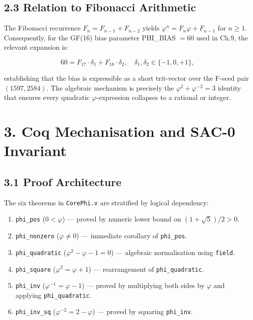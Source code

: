 \subsection{2.3 Relation to Fibonacci
Arithmetic}\label{fa_03:relation-to-fibonacci-arithmetic}

The Fibonacci recurrence
\(F_n = F_{n-1} + F_{n-2}\) yields
\(\varphi^n = F_n \varphi + F_{n-1}\) for
\(n \geq 1\). Consequently, for the GF(16) bias
parameter PHI\_BIAS \(= 60\) used in Ch.9, the
relevant expansion is:

\[60 = F_{17} \cdot \delta_1 + F_{18} \cdot \delta_2, \quad \delta_1, \delta_2 \in \{-1, 0, +1\},\]

establishing that the bias is expressible as a
short trit-vector over the F-seed pair
\((1597, 2584)\). The algebraic mechanism is
precisely the \(\varphi^2 + \varphi^{-2} = 3\)
identity that ensures every quadratic
\(\varphi\)-expression collapses to a rational or
integer.

\section{3. Coq Mechanisation and SAC-0
Invariant}\label{fa_03:coq-mechanisation-and-sac-0-invariant}

\subsection{3.1 Proof
Architecture}\label{fa_03:proof-architecture}

The six theorems in \texttt{CorePhi.v} are
stratified by logical dependency:

\begin{enumerate}
\def\labelenumi{\arabic{enumi}.}
\tightlist
\item
  \texttt{phi\_pos} (\(0 < \varphi\)) --- proved
  by numeric lower bound on
  \((1+\sqrt{5})/2 > 0\).
\item
  \texttt{phi\_nonzero} (\(\varphi \neq 0\)) ---
  immediate corollary of \texttt{phi\_pos}.
\item
  \texttt{phi\_quadratic}
  (\(\varphi^2 - \varphi - 1 = 0\)) --- algebraic
  normalisation using \texttt{field}.
\item
  \texttt{phi\_square}
  (\(\varphi^2 = \varphi + 1\)) --- rearrangement
  of \texttt{phi\_quadratic}.
\item
  \texttt{phi\_inv}
  (\(\varphi^{-1} = \varphi - 1\)) --- proved by
  multiplying both sides by \(\varphi\) and
  applying \texttt{phi\_quadratic}.
\item
  \texttt{phi\_inv\_sq}
  (\(\varphi^{-2} = 2 - \varphi\)) --- proved by
  squaring \texttt{phi\_inv}.
\end{enumerate}

